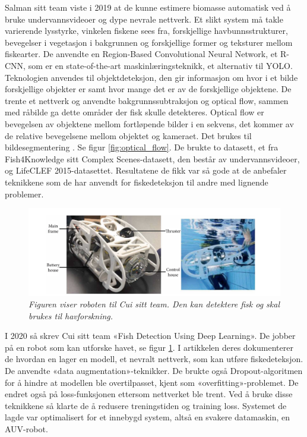 Salman sitt team viste i 2019 at de kunne estimere biomasse automatisk ved å bruke undervannsvideoer og dype nevrale nettverk.  Et slikt system må takle varierende lysstyrke, vinkelen fiskene sees fra, forskjellige havbunnsstrukturer, bevegelser i vegetasjon i bakgrunnen og forskjellige former og teksturer mellom fiskearter. De anvendte en Region-Based Convolutional Neural Network, et R-CNN, som er en state-of-the-art maskinlæringsteknikk, et alternativ til YOLO. Teknologien anvendes til objektdeteksjon, den gir informasjon om hvor i et bilde forskjellige objekter er samt hvor mange det er av de forskjellige objektene. De trente et nettverk og anvendte bakgrunnssubtraksjon og optical flow, sammen med råbilde ga dette områder der fisk skulle detekteres. Optical flow er bevegelsen av objektene mellom fortløpende bilder i en sekvens, det kommer av de relative bevegelsene mellom objektet og kameraet. Det brukes til bildesegmentering \cite{Lin 2019}. Se figur \ref{fig:optical_flow}. De brukte to datasett, et fra Fish4Knowledge sitt Complex Scenes-datasett, den består av undervannsvideoer, og LifeCLEF 2015-datasettet. Resultatene de fikk var så gode at de anbefaler teknikkene som de har anvendt for fiskedeteksjon til andre med lignende problemer. \cite{Salman m.fl. 2019}

\begin{figure}
\begin{center} 
\includegraphics[scale=0.45]{figures/auv}
\caption{\small \sl Figuren viser roboten til Cui sitt team. Den kan detektere fisk og skal brukes til havforskning. \cite{Cui m.fl. 2020} \label{fig:auv}} 
\end{center} 
\end{figure} 

I 2020 så skrev Cui sitt team «Fish Detection Using Deep Learning». De jobber på en robot som kan utforske havet, se figur \ref{fig:auv}. I artikkelen deres dokumenterer de hvordan en lager en modell, et nevralt nettverk, som kan utføre fiskedeteksjon. De anvendte «data augmentation»-teknikker. De brukte også Dropout-algoritmen for å hindre at modellen ble overtilpasset, kjent som «overfitting»-problemet. De endret også på loss-funksjonen ettersom nettverket ble trent. Ved å bruke disse teknikkene så klarte de å redusere treningstiden og training loss. Systemet de lagde var optimalisert for et innebygd system, altså en svakere datamaskin, en AUV-robot. \cite{Cui m.fl. 2020}

